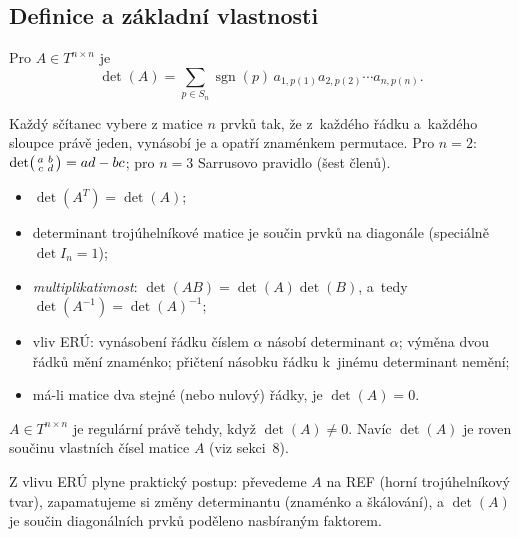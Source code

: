 \documentclass[11pt,a4paper]{article}
\newcommand{\sgn}{\operatorname{sgn}}
\begin{document}
\subsection{Definice a základní vlastnosti}

\begin{definice}[Determinant]
Pro $A\in T^{n\times n}$ je
\[
  \det(A)=\sum_{p\in S_n}\sgn(p)\,a_{1,p(1)}a_{2,p(2)}\cdots a_{n,p(n)}.
\]
\end{definice}

\begin{intuice}
Každý sčítanec vybere z matice $n$ prvků tak, že z~každého řádku a~každého sloupce právě jeden, vynásobí je a opatří znaménkem permutace. Pro $n=2$: $\det\begin{psmallmatrix}a&b\\c&d\end{psmallmatrix}=ad-bc$; pro $n=3$ Sarrusovo pravidlo (šest členů).
\end{intuice}

\begin{veta}
\begin{itemize}
  \item $\det(A^T)=\det(A)$;
  \item determinant trojúhelníkové matice je součin prvků na diagonále (speciálně $\det I_n=1$);
  \item \emph{multiplikativnost}: $\det(AB)=\det(A)\det(B)$, a~tedy $\det(A^{-1})=\det(A)^{-1}$;
  \item vliv ERÚ: vynásobení řádku číslem $\alpha$ násobí determinant $\alpha$; výměna dvou řádků mění znaménko; přičtení násobku řádku k~jinému determinant nemění;
  \item má-li matice dva stejné (nebo nulový) řádky, je $\det(A)=0$.
\end{itemize}
\end{veta}

\begin{veta}
$A\in T^{n\times n}$ je regulární právě tehdy, když $\det(A)\neq0$. Navíc $\det(A)$ je roven součinu vlastních čísel matice $A$ (viz sekci~8).
\end{veta}

\begin{poznamka}
Z vlivu ERÚ plyne praktický postup: převedeme $A$ na REF (horní trojúhelníkový tvar), zapamatujeme si změny determinantu (znaménko a škálování), a $\det(A)$ je součin diagonálních prvků poděleno nasbíraným faktorem.
\end{poznamka}
\end{document}
